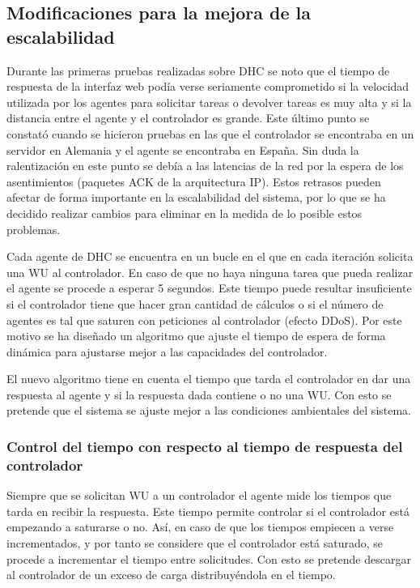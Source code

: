 \subsection{Modificaciones para la mejora de la escalabilidad}

Durante las primeras pruebas realizadas sobre DHC se noto que el tiempo de respuesta de la interfaz web podía verse seriamente comprometido si la velocidad utilizada por los agentes para solicitar tareas o devolver tareas es muy alta y si la distancia entre el agente y el controlador es grande. Este último punto se constató cuando se hicieron pruebas en las que el controlador se encontraba en un servidor en Alemania y el agente se encontraba en España. Sin duda la ralentización en este punto se debía a las latencias de la red por la espera de los asentimientos (paquetes ACK de la arquitectura IP). Estos retrasos pueden afectar de forma importante en la escalabilidad del sistema, por lo que se ha decidido realizar cambios para eliminar en la medida de lo posible estos problemas.

Cada agente de DHC se encuentra en un bucle en el que en cada iteración solicita una WU al controlador. En caso de que no haya ninguna tarea que pueda realizar el agente se procede a esperar 5 segundos. Este tiempo puede resultar insuficiente si el controlador tiene que hacer gran cantidad de cálculos o si el número de agentes es tal que saturen con peticiones al controlador (efecto DDoS). Por este motivo se ha diseñado un algoritmo que ajuste el tiempo de espera de forma dinámica para ajustarse mejor a las capacidades del controlador.

El nuevo algoritmo tiene en cuenta el tiempo que tarda el controlador en dar una respuesta al agente y si la respuesta dada contiene o no una WU. Con esto se pretende que el sistema se ajuste mejor a las condiciones ambientales del sistema.

\subsubsection{Control del tiempo con respecto al tiempo de respuesta del controlador}

Siempre que se solicitan WU a un controlador el agente mide los tiempos que tarda en recibir la respuesta. Este tiempo permite controlar si el controlador está empezando a saturarse o no. Así, en caso de que los tiempos empiecen a verse incrementados, y por tanto se considere que el controlador está saturado, se procede a incrementar el tiempo entre solicitudes. Con esto se pretende descargar al controlador de un exceso de carga distribuyéndola en el tiempo.

